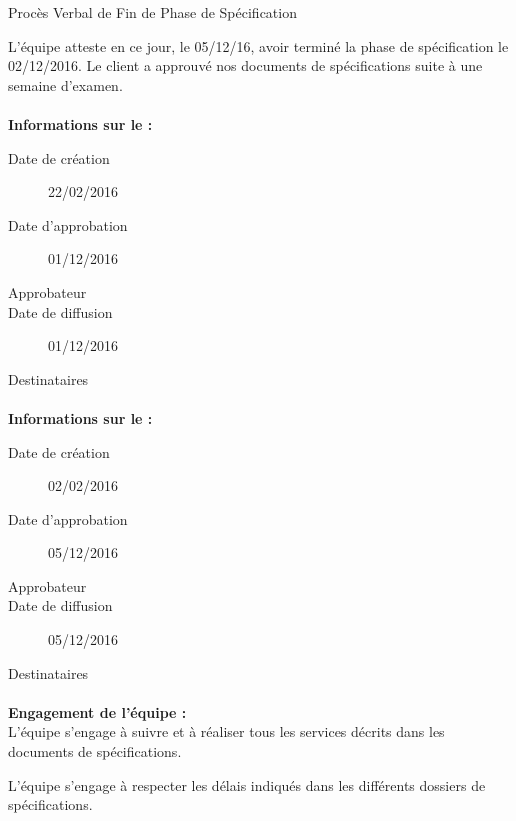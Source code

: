 \documentclass[asi, sansVersion]{picInsa}
\begin{document}
 
 \begin{center}
  \LARGE{}
    Procès Verbal de Fin de Phase de Spécification\\
 \end{center}
 
 \normalsize{}
 
L'équipe \nomEquipe{} atteste en ce jour, le 05/12/16, avoir terminé la phase de spécification le 02/12/2016.
Le client a approuvé nos documents de spécifications suite à une semaine d'examen.


\paragraph{}
\textbf{Informations sur le \DSECourt{} :}

\begin{description}
  \item[Date de création]22/02/2016
  \item[Date d'approbation]01/12/2016
  \item[Approbateur]\nomClient
  \item[Date de diffusion] 01/12/2016
  \item[Destinataires]\nomEquipe
\end{description}


\paragraph{}
\textbf{Informations sur le \PTVCourt :}

\begin{description}
  \item[Date de création]02/02/2016
  \item[Date d'approbation]05/12/2016
  \item[Approbateur]\nomClient
  \item[Date de diffusion]05/12/2016
  \item[Destinataires]\nomEquipe
\end{description}

\paragraph{}
\textbf{Engagement de l'équipe :}\\


L'équipe \nomEquipe{} s'engage à suivre et à réaliser tous les services décrits dans les documents de spécifications.


L'équipe \nomEquipe{} s'engage à respecter les délais indiqués dans les différents dossiers de spécifications.
\end{document}
